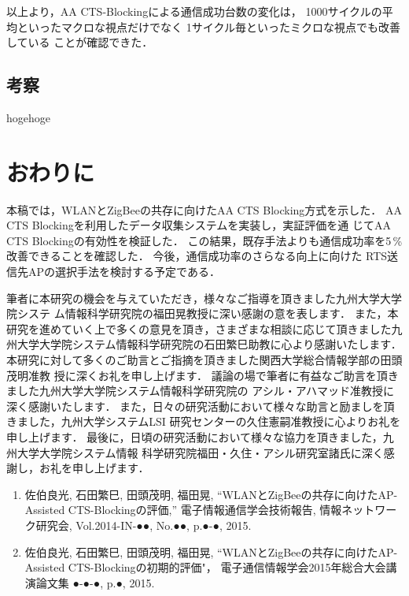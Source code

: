 \documentclass[12pt]{jreport}
\begin{document}
以上より，AA CTS-Blockingによる通信成功台数の変化は，
1000サイクルの平均といったマクロな視点だけでなく
1サイクル毎といったミクロな視点でも改善している
ことが確認できた．

\section{考察}
\label{sec:considering}

hogehoge

\chapter{おわりに}
\label{conclu}

本稿では，WLANとZigBeeの共存に向けたAA CTS Blocking方式を示した．
AA CTS Blockingを利用したデータ収集システムを実装し，実証評価を通
じてAA CTS Blockingの有効性を検証した．
この結果，既存手法よりも通信成功率を5\,\%改善できることを確認した．
今後，通信成功率のさらなる向上に向けた
RTS送信先APの選択手法を検討する予定である．

\acknowledgment
筆者に本研究の機会を与えていただき，様々なご指導を頂きました九州大学大学院システ
ム情報科学研究院の福田晃教授に深い感謝の意を表します．
また，本研究を進めていく上で多くの意見を頂き，さまざまな相談に応じて頂きました九
州大学大学院システム情報科学研究院の石田繁巳助教に心より感謝いたします．
本研究に対して多くのご助言とご指摘を頂きました関西大学総合情報学部の田頭茂明准教
授に深くお礼を申し上げます．
議論の場で筆者に有益なご助言を頂きました九州大学大学院システム情報科学研究院の
アシル・アハマッド准教授に深く感謝いたします．
また，日々の研究活動において様々な助言と励ましを頂きました，九州大学システムLSI
研究センターの久住憲嗣准教授に心よりお礼を申し上げます．
最後に，日頃の研究活動において様々な協力を頂きました，九州大学大学院システム情報
科学研究院福田・久住・アシル研究室諸氏に深く感謝し，お礼を申し上げます．




\publishedjournal
\begin{enumerate}%

\item{佐伯良光, 石田繁巳, 田頭茂明, 福田晃, 
``WLANとZigBeeの共存に向けたAP-Assisted CTS-Blockingの評価,'' 電子情報通信学会技術報告, 
情報ネットワーク研究会, Vol.2014-IN-●●, No.●●, p.●-●, 2015.}

\item{佐伯良光, 石田繁巳, 田頭茂明, 福田晃, ``WLANとZigBeeの共存に向けたAP-Assisted CTS-Blockingの初期的評価"，
電子通信情報学会2015年総合大会講演論文集 ●-●-●, p.●, 2015.}


\end{enumerate}
\end{document}
